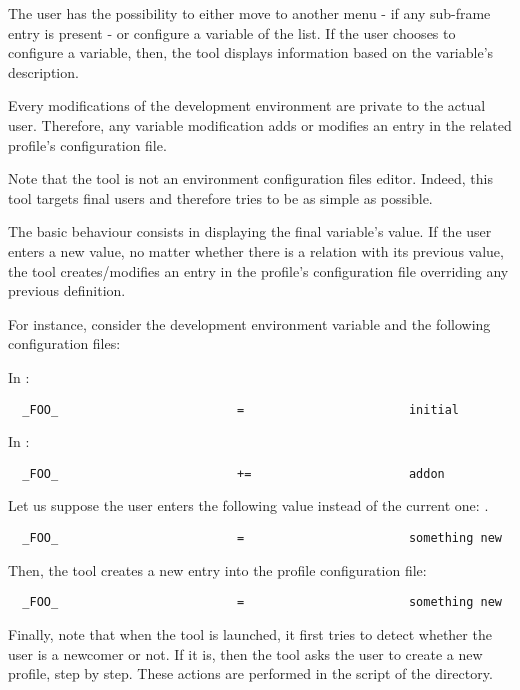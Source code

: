The user has the possibility to either move to another menu - if any sub-frame
entry is present - or configure a variable of the list. If the user chooses
to configure a variable, then, the tool displays information based on the
variable's description.

Every modifications of the development environment are private to the actual
user. Therefore, any variable modification adds or modifies an entry in the
related  profile's configuration file.

Note that the  tool is not an environment configuration
files editor. Indeed, this tool targets final users and therefore tries to
be as simple as possible.

The basic  behaviour consists in displaying the final
variable's value. If the user enters a new value, no matter whether there is
a relation with its previous value, the tool creates/modifies an entry in the
 profile's configuration file overriding any previous definition.

For instance, consider the  development environment variable
and the following configuration files:

In :

\begin{verbatim}
  _FOO_                         =                       initial
\end{verbatim}

In :

\begin{verbatim}
  _FOO_                         +=                      addon
\end{verbatim}

Let us suppose the user enters the following value instead of the current
one: .

\begin{verbatim}
  _FOO_                         =                       something new
\end{verbatim}

Then, the  tool creates a new entry into the 
profile configuration file:

\begin{verbatim}
  _FOO_                         =                       something new
\end{verbatim}

Finally, note that when the  tool is launched, it first
tries to detect whether the user is a newcomer or not. If it is, then the
tool asks the user to create a new  profile, step by step. These
actions are performed in the  script of the
 directory.

